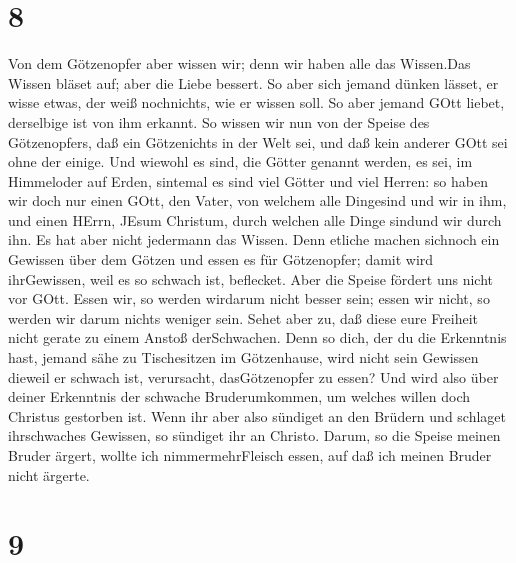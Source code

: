 \hypertarget{section-7}{%
\section{8}\label{section-7}}

 Von dem Götzenopfer aber wissen wir; denn wir haben alle
das Wissen.Das Wissen bläset auf; aber die Liebe bessert. 
So aber sich jemand dünken lässet, er wisse etwas, der weiß nochnichts,
wie er wissen soll.  So aber jemand GOtt liebet, derselbige
ist von ihm erkannt.  So wissen wir nun von der Speise des
Götzenopfers, daß ein Götzenichts in der Welt sei, und daß kein anderer
GOtt sei ohne der einige.  Und wiewohl es sind, die Götter
genannt werden, es sei, im Himmeloder auf Erden, sintemal es sind viel
Götter und viel Herren:  so haben wir doch nur einen GOtt,
den Vater, von welchem alle Dingesind und wir in ihm, und einen HErrn,
JEsum Christum, durch welchen alle Dinge sindund wir durch ihn.
 Es hat aber nicht jedermann das Wissen. Denn etliche machen
sichnoch ein Gewissen über dem Götzen und essen es für Götzenopfer;
damit wird ihrGewissen, weil es so schwach ist, beflecket. 
Aber die Speise fördert uns nicht vor GOtt. Essen wir, so werden
wirdarum nicht besser sein; essen wir nicht, so werden wir darum nichts
weniger sein.  Sehet aber zu, daß diese eure Freiheit nicht
gerate zu einem Anstoß derSchwachen.  Denn so dich, der du
die Erkenntnis hast, jemand sähe zu Tischesitzen im Götzenhause, wird
nicht sein Gewissen dieweil er schwach ist, verursacht, dasGötzenopfer
zu essen?  Und wird also über deiner Erkenntnis der
schwache Bruderumkommen, um welches willen doch Christus gestorben ist.
 Wenn ihr aber also sündiget an den Brüdern und schlaget
ihrschwaches Gewissen, so sündiget ihr an Christo.  Darum,
so die Speise meinen Bruder ärgert, wollte ich nimmermehrFleisch essen,
auf daß ich meinen Bruder nicht ärgerte.

\hypertarget{section-8}{%
\section{9}\label{section-8}}

